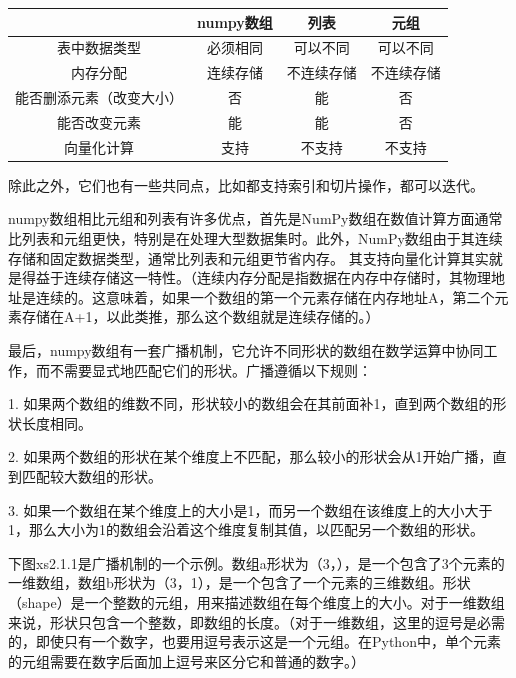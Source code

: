 \documentclass[12pt]{article}
\begin{document}
\begin{table}[H]
\begin{tabular}{|c|c|c|c|}
\hline
\cellcolor[HTML]{FFFFFF} & numpy数组 & 列表    & 元组    \\ \hline
表中数据类型                   & 必须相同    & 可以不同  & 可以不同  \\ \hline
内存分配                     & 连续存储    & 不连续存储 & 不连续存储 \\ \hline
能否删添元素（改变大小）             & 否       & 能     & 否     \\ \hline
能否改变元素                   & 能       & 能     & 否     \\ \hline
向量化计算                    & 支持      & 不支持   & 不支持   \\ \hline
\end{tabular}
\end{table}
除此之外，它们也有一些共同点，比如都支持索引和切片操作，都可以迭代。

numpy数组相比元组和列表有许多优点，首先是NumPy数组在数值计算方面通常比列表和元组更快，特别是在处理大型数据集时。此外，NumPy数组由于其连续存储和固定数据类型，通常比列表和元组更节省内存。
其支持向量化计算其实就是得益于连续存储这一特性。（连续内存分配是指数据在内存中存储时，其物理地址是连续的。这意味着，如果一个数组的第一个元素存储在内存地址A，第二个元素存储在A+1，以此类推，那么这个数组就是连续存储的。）

最后，numpy数组有一套广播机制，它允许不同形状的数组在数学运算中协同工作，而不需要显式地匹配它们的形状。广播遵循以下规则：\label{广播机制}

1. 如果两个数组的维数不同，形状较小的数组会在其前面补1，直到两个数组的形状长度相同。

2. 如果两个数组的形状在某个维度上不匹配，那么较小的形状会从1开始广播，直到匹配较大数组的形状。

3. 如果一个数组在某个维度上的大小是1，而另一个数组在该维度上的大小大于1，那么大小为1的数组会沿着这个维度复制其值，以匹配另一个数组的形状。

下图xs2.1.1是广播机制的一个示例。数组a形状为（3，），是一个包含了3个元素的一维数组，数组b形状为（3，1），是一个包含了一个元素的三维数组。形状（shape）是一个整数的元组，用来描述数组在每个维度上的大小。对于一维数组来说，形状只包含一个整数，即数组的长度。（对于一维数组，这里的逗号是必需的，即使只有一个数字，也要用逗号表示这是一个元组。在Python中，单个元素的元组需要在数字后面加上逗号来区分它和普通的数字。）
\end{document}
